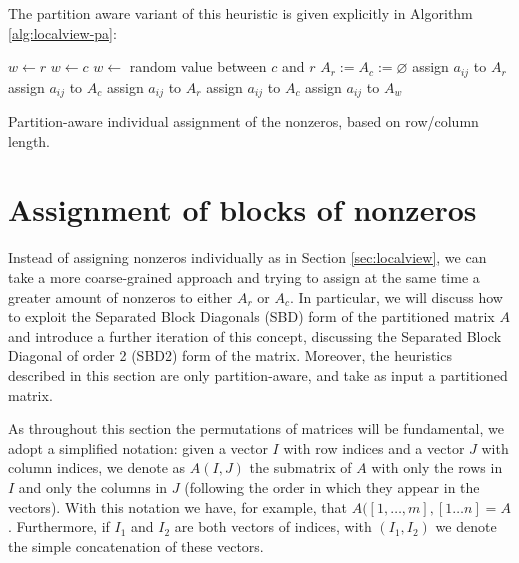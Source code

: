 The partition aware variant of this heuristic is given explicitly in Algorithm \ref{alg:localview-pa}:

\begin{algorithm}[h]
	\begin{algorithmic}
		\State
		\State $w \gets r$ 
		\State $w \gets c$
		\Else
		\State $w \gets$ random value between $c$ and $r$
		\EndIf
		\State $A_r := A_c := \varnothing$
		\State assign $a_{ij}$ to $A_r$
		\State assign $a_{ij}$ to $A_c$
		\Else
		\State assign $a_{ij}$ to $A_r$
		\State assign $a_{ij}$ to $A_c$
		\Else
		\State assign $a_{ij}$ to $A_w$
		\EndIf
		\EndIf
		\EndFor
	\end{algorithmic}
	\caption{Partition-aware individual assignment of the nonzeros, based on row/column length.} \label{alg:localview-pa}
\end{algorithm}

\section{Assignment of blocks of nonzeros} \label{sec:sbd}

Instead of assigning nonzeros individually as in Section \ref{sec:localview}, we can take a more coarse-grained approach and trying to assign at the same time a greater amount of nonzeros to either $A_r$ or $A_c$. In particular, we will discuss how to exploit the Separated Block Diagonals (SBD) form of the partitioned matrix $A$ and introduce a further iteration of this concept, discussing the Separated Block Diagonal of order 2 (SBD2) form of the matrix. Moreover, the heuristics described in this section are only partition-aware, and take as input a partitioned matrix.

As throughout this section the permutations of matrices will be fundamental, we adopt a simplified notation: given a vector $I$ with row indices and a vector $J$ with column indices, we denote as $A(I,J)$ the submatrix of $A$ with only the rows in $I$ and only the columns in $J$ (following the order in which they appear in the vectors). With this notation we have, for example, that $A([1,\dots,m],[1 \dots n] = A$. Furthermore, if $I_1$ and $I_2$ are both vectors of indices, with $(I_1,I_2)$ we denote the simple concatenation of these vectors.

